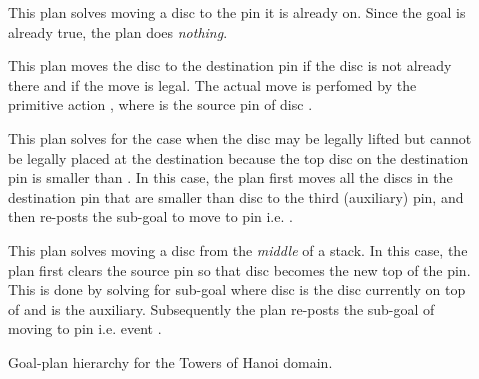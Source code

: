 \begin{description}

\item[] This plan solves moving a disc to the pin it is
already on. Since the goal is already true, the plan does \emph{nothing}.

\item[] This plan moves the disc  to the destination
pin  if the disc is not already there and if the move is legal. The actual move
is perfomed by the primitive action , where  is the source pin
of disc .

\item[] This plan solves for the case when the disc  
may be legally lifted but cannot be legally placed at the destination because the 
top disc on the destination pin is smaller than .
In this case, the plan first moves all the discs in the destination pin that are
smaller than disc  to the third (auxiliary) pin, and then
re-posts the sub-goal to move  to pin  i.e. . 

\item[] This plan solves moving a disc from the
\emph{middle} of a stack.
In this case, the plan first clears the source pin so
that disc  becomes the new top of the pin. This is done by
solving for sub-goal  where disc  is the
disc currently on top of  and  is the
auxiliary.
Subsequently the plan re-posts the
sub-goal of moving  to pin  i.e. event .
\end{description}


\begin{figure}[t]
\begin{center}
\resizebox{.9\textwidth}{!}{}
\end{center}
\caption{Goal-plan hierarchy for the Towers of Hanoi domain.}
\label{fig:hanoi_goalplan}
\end{figure}


